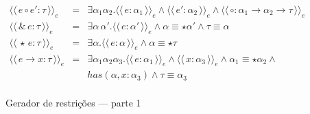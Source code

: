 \documentclass[a4paper,8pt]{article}
\newcommand{\constre}[1]{\ensuremath{\langle\langle\,#1\,\rangle\rangle_{e}}}
\begin{document}
\begin{figure}[h]
\[{\begin{array}{lcl}
                     \constre{e \circ e' : \tau} & = & \exists
                                                      \alpha_1\alpha_2.\constre{e
                                                      :\alpha_1} \land
                                                      \constre{e' :
                                                      \alpha_2} \land
                                                      \constre{\circ :
                                                      \alpha_1\to\alpha_2\to\tau}\\
                     \constre{\&\,e : \tau} & = & \exists \alpha\,
                                                 \alpha'. \constre{e :
                                                 \alpha'} \land
                                                 \alpha \equiv \star \alpha'
                                                 \land \tau \equiv \alpha\\
                     \constre{\star\,e : \tau} & = & \exists
                                                    \alpha. \constre{e
                                                    : \alpha} \land
                                                    \alpha \equiv \star \tau\\
                     \constre{e\to x : \tau} & = & \exists
                                                  \alpha_1\alpha_2\alpha_3. \constre{e
                                                  :\alpha_1} \land
                                                  \constre{x :
                                                  \alpha_3} \land
                                                  \alpha_1 \equiv \star\alpha_2
                                                  \land\\
                          & & has(\alpha,x : \alpha_3) \land \tau
                              \equiv \alpha_3\\
            \end{array}}
       \]
       \centering
       \caption{Gerador de restrições --- parte 1}
       \label{figgen}
     \end{figure}
\end{document}
